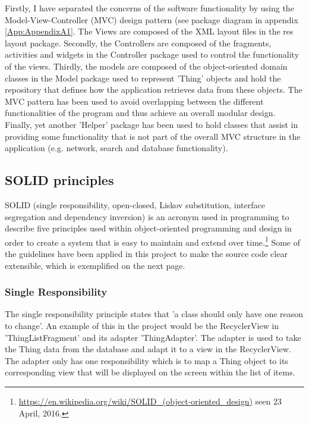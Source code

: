\documentclass{article} %
\begin{document}
Firstly, I have separated the concerns of the software functionality by using the Model-View-Controller (MVC) design pattern (see package diagram in appendix \ref{App:AppendixA1}. The Views are composed of the XML layout files in the res layout package. Secondly, the Controllers are composed of the fragments, activities and widgets in the Controller package used to control the functionality of the views. Thirdly, the models are composed of the object-oriented domain classes in the Model package used to represent 'Thing' objects and hold the repository that defines how the application retrieves data from these objects. The MVC pattern has been used to avoid overlapping between the different functionalities of the program and thus achieve an overall modular design. Finally, yet another 'Helper' package has been used to hold classes that assist in providing some functionality that is not part of the overall MVC structure in the application (e.g. network, search and database functionality). 

\subsection{SOLID principles}

SOLID (single responsibility, open-closed, Liskov substitution, interface segregation and dependency inversion) is an acronym used in programming to describe five principles used within object-oriented programming and design in order to create a system that is easy to maintain and extend over time.\footnote{\url{https://en.wikipedia.org/wiki/SOLID_(object-oriented_design)} seen 23 April, 2016.} Some of the guidelines have been applied in this project to make the source code clear extensible, which is exemplified on the next page.

\subsubsection{Single Responsibility}

The single responsibility principle states that 'a class should only have one reason to change'. An example of this in the project would be the RecyclerView in 'ThingListFragment' and its adapter 'ThingAdapter'. The adapter is used to take the Thing data from the database and adapt it to a view in the RecyclerView. The adapter only has one responsibility which is to map a Thing object to its corresponding view that will be displayed on the screen within the list of items.
\end{document}

